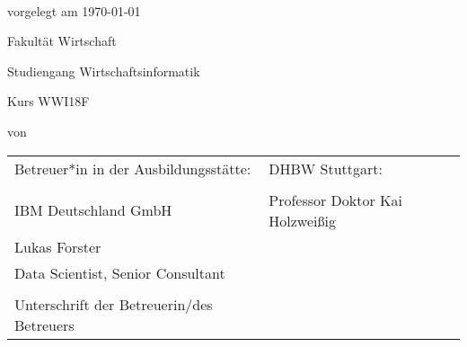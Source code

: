 \begin{spacing}{1}
\begin{center}	
~\vspace{0mm}

{\sffamily
    \LARGE  
    \textbf{\themaMeinerArbeit}
    
    \bigskip
    \textbf{\unterThemaMeinerArbeit}
}

\vspace{15mm}

{\Large \typMeinerArbeit}

\vspace{1cm}

vorgelegt am \today 

\vspace{15mm}

Fakultät Wirtschaft
\medskip

Studiengang Wirtschaftsinformatik
\medskip

Kurs WWI18F 

\vspace{10mm}

von

\vspace{10mm}

{\large\textsc{\meinName}}

\vspace{10mm}
\end{center}

\vfill

\begin{tabular}{ll}
Betreuer*in in der Ausbildungsstätte: & DHBW Stuttgart: \\
\hspace{0.4\linewidth} & \\
IBM Deutschland GmbH & Professor Doktor Kai Holzweißig \\
Lukas Forster & \\
Data Scientist, Senior Consultant \\
\\
Unterschrift der Betreuerin/des Betreuers \\
\end{tabular}


\vspace{1cm}
\end{spacing}

